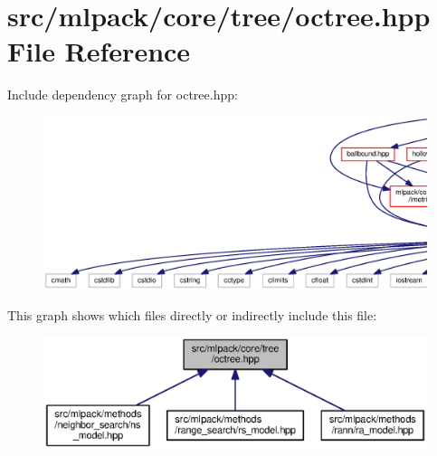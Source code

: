 \section{src/mlpack/core/tree/octree.hpp File Reference}
\label{octree_8hpp}
Include dependency graph for octree.\+hpp\+:
\nopagebreak
\begin{figure}[H]
\begin{center}
\leavevmode
\includegraphics[width=350pt]{octree_8hpp__incl}
\end{center}
\end{figure}
This graph shows which files directly or indirectly include this file\+:
\nopagebreak
\begin{figure}[H]
\begin{center}
\leavevmode
\includegraphics[width=350pt]{octree_8hpp__dep__incl}
\end{center}
\end{figure}

